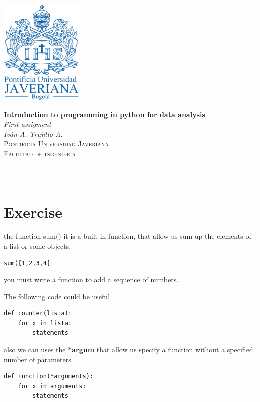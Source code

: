 \documentclass[10pt,a4paper]{article}
\author{Iván Andrés Trujillo }
\begin{document}
\newcommand{\HRule}{\rule{\linewidth}{0.5mm}}


\includegraphics[width = 4cm]{pujshield.eps}\\[0.5cm] 

\begin{center} 
\textbf{\LARGE
Introduction to programming in python for data analysis}\\[0.2cm]
\emph{\LARGE First assigment }\\[0.3cm] 
\emph{Iván A. Trujillo A.} \\
\textsc{\Large Pontificia Universidad Javeriana
}\\[0.2cm] 
\textsc{\large Facultad de ingeniería}\\[0.5cm] 
\HRule \\[0.4cm]
\end{center}

\section{Exercise}
the function sum() it is a built-in function, that allow us sum up the elements of a list or some objects.
\begin{lstlisting}
sum([1,2,3,4]
\end{lstlisting}
you must write a function to add a sequence of numbers.

The following code could be useful
\begin{lstlisting}
def counter(lista):
	for x in lista:
		statements
\end{lstlisting}

also we can uses the \textbf{*argum}
that allow us specify a function without a specified number of parameters. 
\begin{lstlisting}
def Function(*arguments):
	for x in arguments:
		statements
\end{lstlisting}
\end{document}
